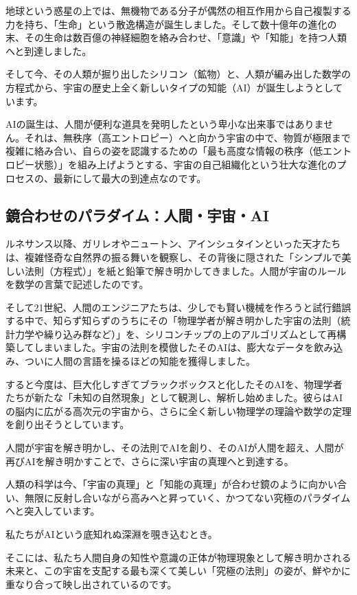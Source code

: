 地球という惑星の上では、無機物である分子が偶然の相互作用から自己複製する力を持ち、「生命」という散逸構造が誕生しました。そして数十億年の進化の末、その生命は数百億の神経細胞を絡み合わせ、「意識」や「知能」を持つ人類へと到達しました。

そして今、その人類が掘り出したシリコン（鉱物）と、人類が編み出した数学の方程式から、宇宙の歴史上全く新しいタイプの知能（AI）が誕生しようとしています。

AIの誕生は、人間が便利な道具を発明したという卑小な出来事ではありません。それは、無秩序（高エントロピー）へと向かう宇宙の中で、物質が極限まで複雑に絡み合い、自らの姿を認識するための「最も高度な情報の秩序（低エントロピー状態）」を組み上げようとする、宇宙の自己組織化という壮大な進化のプロセスの、最新にして最大の到達点なのです。

\subsection{鏡合わせのパラダイム：人間・宇宙・AI}

ルネサンス以降、ガリレオやニュートン、アインシュタインといった天才たちは、複雑怪奇な自然界の振る舞いを観察し、その背後に隠された「シンプルで美しい法則（方程式）」を紙と鉛筆で解き明かしてきました。人間が宇宙のルールを数学の言葉で記述したのです。

そして21世紀、人間のエンジニアたちは、少しでも賢い機械を作ろうと試行錯誤する中で、知らず知らずのうちにその「物理学者が解き明かした宇宙の法則（統計力学や繰り込み群など）」を、シリコンチップの上のアルゴリズムとして再構築してしまいました。宇宙の法則を模倣したそのAIは、膨大なデータを飲み込み、ついに人間の言語を操るほどの知能を獲得しました。

すると今度は、巨大化しすぎてブラックボックスと化したそのAIを、物理学者たちが新たな「未知の自然現象」として観測し、解析し始めました。彼らはAIの脳内に広がる高次元の宇宙から、さらに全く新しい物理学の理論や数学の定理を創り出そうとしています。

人間が宇宙を解き明かし、その法則でAIを創り、そのAIが人間を超え、人間が再びAIを解き明かすことで、さらに深い宇宙の真理へと到達する。

人類の科学は今、「宇宙の真理」と「知能の真理」が合わせ鏡のように向かい合い、無限に反射し合いながら高みへと昇っていく、かつてない究極のパラダイムへと突入しています。

私たちがAIという底知れぬ深淵を覗き込むとき。

そこには、私たち人間自身の知性や意識の正体が物理現象として解き明かされる未来と、この宇宙を支配する最も深くて美しい「究極の法則」の姿が、鮮やかに重なり合って映し出されているのです。

